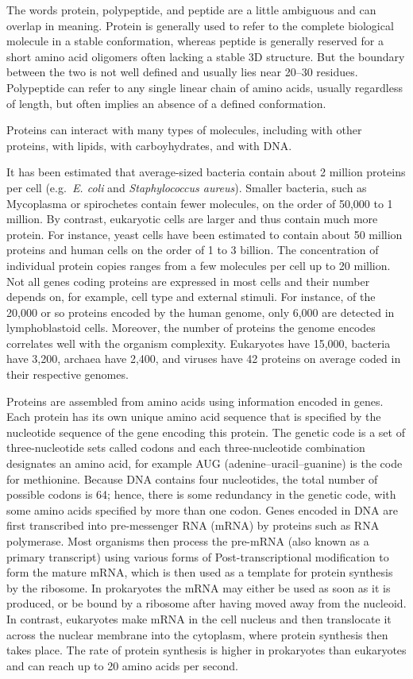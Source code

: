 The words protein, polypeptide, and peptide are a little ambiguous and can overlap in meaning. Protein is generally used to refer to the complete biological molecule in a stable conformation, whereas peptide is generally reserved for a short amino acid oligomers often lacking a stable 3D structure. But the boundary between the two is not well defined and usually lies near 20--30 residues. Polypeptide can refer to any single linear chain of amino acids, usually regardless of length, but often implies an absence of a defined conformation.

Proteins can interact with many types of molecules, including with other proteins, with lipids, with carboyhydrates, and with DNA.

It has been estimated that average-sized bacteria contain about 2 million proteins per cell (e.g.~\emph{E. coli} and \emph{Staphylococcus aureus}). Smaller bacteria, such as Mycoplasma or spirochetes contain fewer molecules, on the order of 50,000 to 1 million. By contrast, eukaryotic cells are larger and thus contain much more protein. For instance, yeast cells have been estimated to contain about 50 million proteins and human cells on the order of 1 to 3 billion. The concentration of individual protein copies ranges from a few molecules per cell up to 20 million. Not all genes coding proteins are expressed in most cells and their number depends on, for example, cell type and external stimuli. For instance, of the 20,000 or so proteins encoded by the human genome, only 6,000 are detected in lymphoblastoid cells. Moreover, the number of proteins the genome encodes correlates well with the organism complexity. Eukaryotes have 15,000, bacteria have 3,200, archaea have 2,400, and viruses have 42 proteins on average coded in their respective genomes.

Proteins are assembled from amino acids using information encoded in genes. Each protein has its own unique amino acid sequence that is specified by the nucleotide sequence of the gene encoding this protein. The genetic code is a set of three-nucleotide sets called codons and each three-nucleotide combination designates an amino acid, for example AUG (adenine--uracil--guanine) is the code for methionine. Because DNA contains four nucleotides, the total number of possible codons is 64; hence, there is some redundancy in the genetic code, with some amino acids specified by more than one codon. Genes encoded in DNA are first transcribed into pre-messenger RNA (mRNA) by proteins such as RNA polymerase. Most organisms then process the pre-mRNA (also known as a primary transcript) using various forms of Post-transcriptional modification to form the mature mRNA, which is then used as a template for protein synthesis by the ribosome. In prokaryotes the mRNA may either be used as soon as it is produced, or be bound by a ribosome after having moved away from the nucleoid. In contrast, eukaryotes make mRNA in the cell nucleus and then translocate it across the nuclear membrane into the cytoplasm, where protein synthesis then takes place. The rate of protein synthesis is higher in prokaryotes than eukaryotes and can reach up to 20 amino acids per second.

